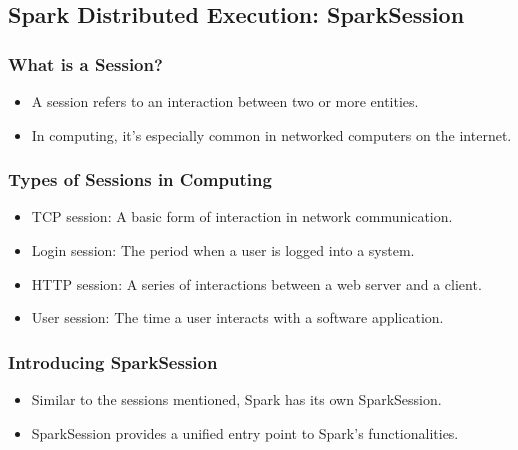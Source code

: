 \subsection{Spark Distributed Execution: SparkSession}\label{subsec:spark-session}
\begin{frame}
    \frametitle{What is a Session?}

    \begin{itemize}
        \item A session refers to an interaction between two or more entities.
        \item In computing, it's especially common in networked computers on the internet.
    \end{itemize}

\end{frame}

\begin{frame}
    \frametitle{Types of Sessions in Computing}

    \begin{itemize}
        \item TCP session: A basic form of interaction in network communication.
        \item Login session: The period when a user is logged into a system.
        \item HTTP session: A series of interactions between a web server and a client.
        \item User session: The time a user interacts with a software application.
    \end{itemize}

\end{frame}

\begin{frame}
    \frametitle{Introducing SparkSession}

    \begin{itemize}
        \item Similar to the sessions mentioned, Spark has its own SparkSession.
        \item SparkSession provides a unified entry point to Spark's functionalities.
    \end{itemize}

\end{frame}

